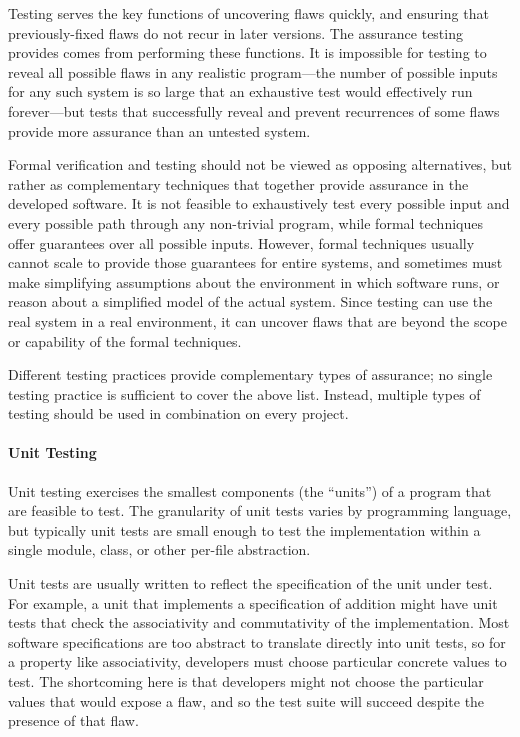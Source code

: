 Testing serves the key functions of uncovering flaws quickly, and
ensuring that previously-fixed flaws do not recur in later
versions. The assurance testing provides comes from performing these
functions. It is impossible for testing to reveal all possible flaws
in any realistic program---the number of possible inputs for any such
system is so large that an exhaustive test would effectively run
forever---but tests that successfully reveal and prevent recurrences
of some flaws provide more assurance than an untested system.

Formal verification and testing should not be viewed as opposing
alternatives, but rather as complementary techniques that together
provide assurance in the developed software. It is not feasible to
exhaustively test every possible input and every possible path through
any non-trivial program, while formal techniques offer guarantees over
all possible inputs. However, formal techniques usually cannot scale
to provide those guarantees for entire systems, and sometimes must
make simplifying assumptions about the environment in which software
runs, or reason about a simplified model of the actual system. Since
testing can use the real system in a real environment, it can uncover
flaws that are beyond the scope or capability of the formal
techniques.

Different testing practices provide complementary types of assurance;
no single testing practice is sufficient to cover the above
list. Instead, multiple types of testing should be used in
combination on every project.

\paragraph{Unit Testing}

Unit testing exercises the smallest components (the ``units'') of a
program that are feasible to test. The granularity of unit tests
varies by programming language, but typically unit tests are small
enough to test the implementation within a single module, class, or
other per-file abstraction.

Unit tests are usually written to reflect the specification of the
unit under test. For example, a unit that implements a specification
of addition might have unit tests that check the associativity and
commutativity of the implementation. Most software specifications are
too abstract to translate directly into unit tests, so for a property
like associativity, developers must choose particular concrete values
to test. The shortcoming here is that developers might not choose the
particular values that would expose a flaw, and so the test suite
will succeed despite the presence of that flaw.

